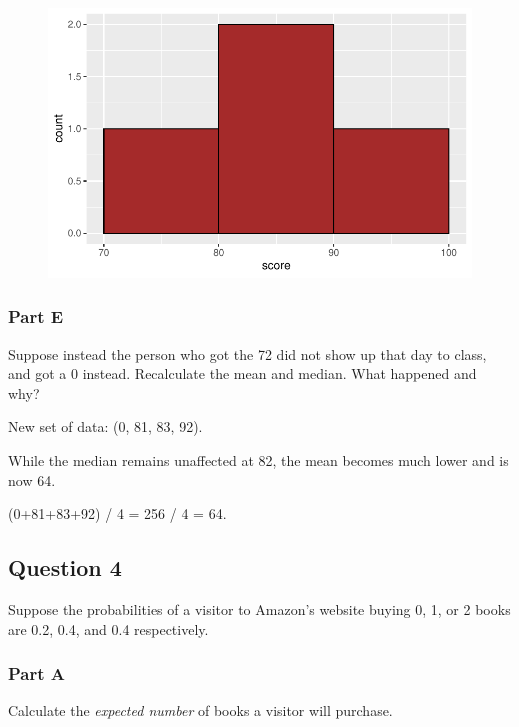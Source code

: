 \documentclass[
  letterpaper,
  DIV=11,
  numbers=noendperiod]{scrartcl}
\begin{document}
\begin{figure}[H]

{\centering \includegraphics{02-problem-set_files/figure-pdf/3-1.pdf}

}

\end{figure}

\hypertarget{part-e}{%
\subsubsection{Part E}\label{part-e}}

Suppose instead the person who got the 72 did not show up that day to
class, and got a 0 instead. Recalculate the mean and median. What
happened and why?

New set of data: (0, 81, 83, 92).

While the median remains unaffected at 82, the mean becomes much lower
and is now 64.

(0+81+83+92) / 4 = 256 / 4 = 64.

\hypertarget{question-4}{%
\subsection{Question 4}\label{question-4}}

Suppose the probabilities of a visitor to Amazon's website buying 0, 1,
or 2 books are 0.2, 0.4, and 0.4 respectively.

\hypertarget{part-a-2}{%
\subsubsection{Part A}\label{part-a-2}}

Calculate the \emph{expected number} of books a visitor will purchase.
\end{document}
